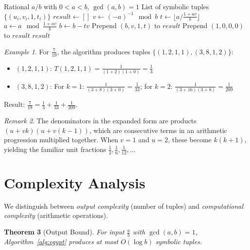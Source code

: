 \documentclass[11pt]{article}
\newtheorem{theorem}{Theorem}
\theoremstyle{definition}
\theoremstyle{remark}
\newtheorem{remark}[theorem]{Remark}
\newtheorem{example}[theorem]{Example}
\begin{document}
\begin{algorithm}[H]
\caption{Egyptian Fraction Decomposition via Modular Inverse}
\label{alg:egypt}
\begin{algorithmic}[1]
\Require Rational $a/b$ with $0 < a < b$, $\gcd(a,b) = 1$
\Ensure List of symbolic tuples $\{(u_i, v_i, 1, t_i)\}$
\State $\textit{result} \gets []$
    \State $v \gets (-a)^{-1} \mod b$ 
    \State $t \gets \lfloor a / \frac{1 + av}{b} \rfloor$
    \State $a \gets a \mod \frac{1 + av}{b}$
    \State $b \gets b - tv$
    \State Prepend $(b, v, 1, t)$ to $\textit{result}$
\EndWhile
{}
    \State Prepend $(1, 0, 0, 0)$ to $\textit{result}$ 
\EndIf
\State \Return $\textit{result}$
\end{algorithmic}
\end{algorithm}

\begin{example}
For $\frac{7}{19}$, the algorithm produces tuples $\{(1, 2, 1, 1), (3, 8, 1, 2)\}$:
\begin{itemize}
\item $(1, 2, 1, 1)$: $T(1,2,1,1) = \frac{1}{(1+2)(1+0)} = \frac{1}{3}$
\item $(3, 8, 1, 2)$: For $k=1$: $\frac{1}{(3+8)(3+0)} = \frac{1}{33}$;
      for $k=2$: $\frac{1}{(3+16)(3+8)} = \frac{1}{209}$
\end{itemize}
Result: $\frac{7}{19} = \frac{1}{3} + \frac{1}{33} + \frac{1}{209}$. \checkmark
\end{example}

\begin{remark}
The denominators in the expanded form are products $(u+vk)(u+v(k-1))$, which
are consecutive terms in an arithmetic progression multiplied together. When
$v = 1$ and $u = 2$, these become $k(k+1)$, yielding the familiar unit fractions
$\frac{1}{2}, \frac{1}{6}, \frac{1}{12}, \ldots$
\end{remark}

\section{Complexity Analysis}

We distinguish between \emph{output complexity} (number of tuples) and
\emph{computational complexity} (arithmetic operations).

\begin{theorem}[Output Bound]
For input $\frac{a}{b}$ with $\gcd(a,b) = 1$, Algorithm~\ref{alg:egypt} produces
at most $O(\log b)$ symbolic tuples.
\end{theorem}
\end{document}
